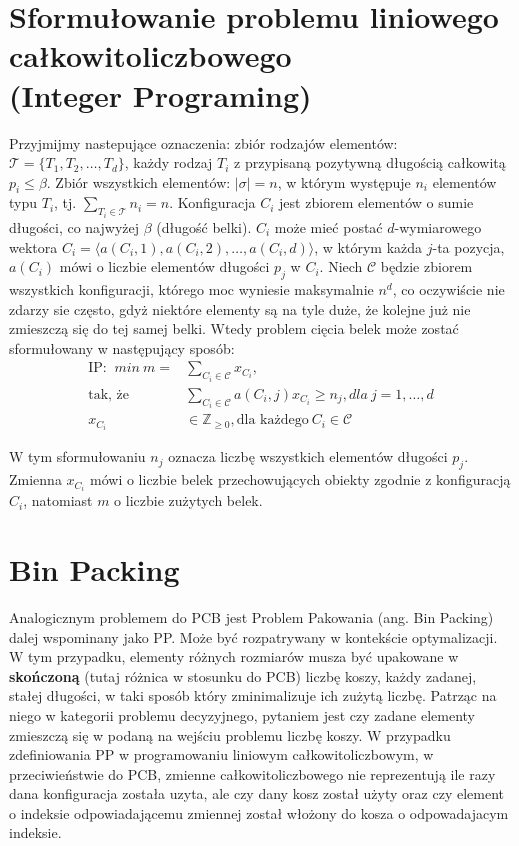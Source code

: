 \section{Sformułowanie problemu liniowego całkowitoliczbowego \\ (Integer Programing)} \label{linear_formula}
Przyjmijmy nastepujące oznaczenia: zbiór rodzajów elementów: $\mathcal{T} = \{T_1, T_2, \dots, T_d\}$, każdy rodzaj $T_i$ z przypisaną pozytywną długością całkowitą $p_i \leq \beta$. Zbiór wszystkich elementów: $|\mathcal{\sigma}| = n$, w którym występuje $n_i$ elementów typu $T_i$, tj. $\sum_{T_i \in \mathcal{T}} n_i = n$.
Konfiguracja $C_i$ jest zbiorem elementów o sumie długości, co najwyżej $\beta$ (długość belki). $C_i$ może mieć postać $d$-wymiarowego wektora $C_i = \langle a(C_i, 1), a(C_i,2), \dots, a(C_i,d)\rangle$, w którym każda $j$-ta pozycja, $a(C_i)$ mówi o liczbie elementów długości $p_j$ w $C_i$. Niech $\mathcal{C}$ będzie zbiorem wszystkich konfiguracji, którego moc wyniesie maksymalnie $n^d$, co oczywiście nie zdarzy sie często, gdyż niektóre elementy są na tyle duże, że kolejne już nie zmieszczą się do tej samej belki.
Wtedy problem cięcia belek może zostać sformułowany w następujący sposób:
\begin{align}
	\text{IP: } \ min \ m =&\sum_{C_i \in \mathcal{C}} x_{C_i}, \\
	\text{tak, że} &\sum_{C_i \in \mathcal{C}} a(C_i,j)x_{C_i} \geq n_j, dla \ j = 1, \dots, d \\
	x_{C_i} &\in \mathbb{Z}_{\geq 0}, \text{dla każdego} \ C_i \in \mathcal{C} 
\end{align}

W tym sformułowaniu $n_j$ oznacza liczbę wszystkich elementów długości $p_j$. Zmienna $x_{C_i}$ mówi o liczbie belek przechowujących obiekty zgodnie z konfiguracją $C_i$, natomiast $m$ o liczbie zużytych belek.

\section{Bin Packing}
Analogicznym problemem do PCB jest Problem Pakowania (ang. Bin Packing) dalej wspominany jako PP.
Może być rozpatrywany w kontekście optymalizacji. W tym przypadku, elementy różnych rozmiarów musza być upakowane w \textbf{skończoną} (tutaj różnica w stosunku do PCB) liczbę koszy, każdy zadanej, stałej długości, w taki sposób który zminimalizuje ich zużytą liczbę. Patrząc na niego w kategorii problemu decyzyjnego, pytaniem jest czy zadane elementy zmieszczą się w podaną na wejściu problemu liczbę koszy.
W przypadku zdefiniowania PP w programowaniu liniowym całkowitoliczbowym, w przeciwieństwie do PCB, zmienne całkowitoliczbowego nie reprezentują ile razy dana konfiguracja została uzyta, ale czy dany kosz został użyty oraz czy element o indeksie odpowiadającemu zmiennej został włożony do kosza o odpowadajacym indeksie.

